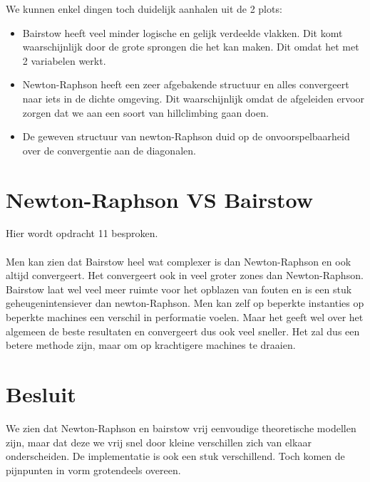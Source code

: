 \documentclass[a4paper,kulak]{kulakarticle}
\begin{document}
We kunnen enkel dingen toch duidelijk aanhalen uit de 2 plots:
\begin{itemize}
	\item Bairstow heeft veel minder logische en gelijk verdeelde vlakken. Dit komt waarschijnlijk door de grote sprongen die het kan maken. Dit omdat het met 2 variabelen werkt.
	\item Newton-Raphson heeft een zeer afgebakende structuur en alles convergeert naar iets in de dichte omgeving. Dit waarschijnlijk omdat de afgeleiden ervoor zorgen dat we aan een soort van hillclimbing gaan doen.
	\item  De geweven structuur van newton-Raphson duid op de onvoorspelbaarheid over de convergentie aan de diagonalen.
\end{itemize}


\section{Newton-Raphson VS Bairstow}
Hier wordt opdracht 11 besproken.
\\~\\
Men kan zien dat Bairstow heel wat complexer is dan Newton-Raphson en ook altijd convergeert. Het convergeert ook in veel groter zones dan Newton-Raphson. Bairstow laat wel veel meer ruimte voor het opblazen van fouten en is een stuk geheugenintensiever dan newton-Raphson. Men kan zelf op beperkte instanties op beperkte machines een verschil in performatie voelen. Maar het geeft wel over het algemeen de beste resultaten en convergeert dus ook veel sneller. Het zal dus een betere methode zijn, maar om op krachtigere machines te draaien.

\section*{Besluit}

We zien dat Newton-Raphson en bairstow vrij eenvoudige theoretische modellen zijn, maar dat deze we vrij snel door kleine verschillen zich van elkaar onderscheiden. De implementatie is ook een stuk verschillend. Toch komen de pijnpunten in vorm grotendeels overeen.




\end{document}
